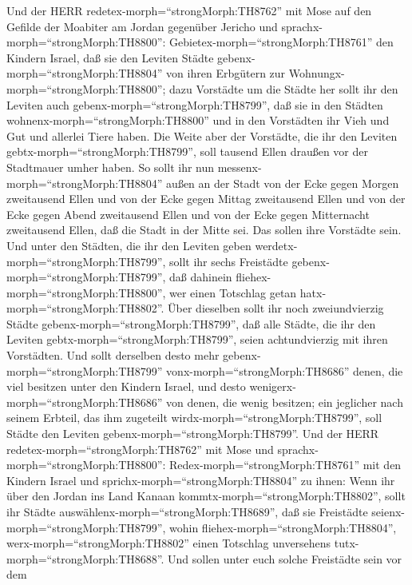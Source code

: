  Und der HERR redetex-morph=``strongMorph:TH8762'' mit Mose
auf den Gefilde der Moabiter am Jordan gegenüber Jericho und
sprachx-morph=``strongMorph:TH8800'': 
Gebietex-morph=``strongMorph:TH8761'' den Kindern Israel, daß sie den
Leviten Städte gebenx-morph=``strongMorph:TH8804'' von ihren Erbgütern
zur Wohnungx-morph=``strongMorph:TH8800'';  dazu Vorstädte
um die Städte her sollt ihr den Leviten auch
gebenx-morph=``strongMorph:TH8799'', daß sie in den Städten
wohnenx-morph=``strongMorph:TH8800'' und in den Vorstädten ihr Vieh und
Gut und allerlei Tiere haben.  Die Weite aber der Vorstädte,
die ihr den Leviten gebtx-morph=``strongMorph:TH8799'', soll tausend
Ellen draußen vor der Stadtmauer umher haben.  So sollt ihr
nun messenx-morph=``strongMorph:TH8804'' außen an der Stadt von der Ecke
gegen Morgen zweitausend Ellen und von der Ecke gegen Mittag zweitausend
Ellen und von der Ecke gegen Abend zweitausend Ellen und von der Ecke
gegen Mitternacht zweitausend Ellen, daß die Stadt in der Mitte sei. Das
sollen ihre Vorstädte sein.  Und unter den Städten, die ihr
den Leviten geben werdetx-morph=``strongMorph:TH8799'', sollt ihr sechs
Freistädte gebenx-morph=``strongMorph:TH8799'', daß dahinein
fliehex-morph=``strongMorph:TH8800'', wer einen Totschlag getan
hatx-morph=``strongMorph:TH8802''. Über dieselben sollt ihr noch
zweiundvierzig Städte gebenx-morph=``strongMorph:TH8799'', 
daß alle Städte, die ihr den Leviten gebtx-morph=``strongMorph:TH8799'',
seien achtundvierzig mit ihren Vorstädten.  Und sollt
derselben desto mehr gebenx-morph=``strongMorph:TH8799''
vonx-morph=``strongMorph:TH8686'' denen, die viel besitzen unter den
Kindern Israel, und desto wenigerx-morph=``strongMorph:TH8686'' von
denen, die wenig besitzen; ein jeglicher nach seinem Erbteil, das ihm
zugeteilt wirdx-morph=``strongMorph:TH8799'', soll Städte den Leviten
gebenx-morph=``strongMorph:TH8799''.  Und der HERR
redetex-morph=``strongMorph:TH8762'' mit Mose und
sprachx-morph=``strongMorph:TH8800'': 
Redex-morph=``strongMorph:TH8761'' mit den Kindern Israel und
sprichx-morph=``strongMorph:TH8804'' zu ihnen: Wenn ihr über den Jordan
ins Land Kanaan kommtx-morph=``strongMorph:TH8802'',  sollt
ihr Städte auswählenx-morph=``strongMorph:TH8689'', daß sie Freistädte
seienx-morph=``strongMorph:TH8799'', wohin
fliehex-morph=``strongMorph:TH8804'', werx-morph=``strongMorph:TH8802''
einen Totschlag unversehens tutx-morph=``strongMorph:TH8688''.
 Und sollen unter euch solche Freistädte sein vor dem
